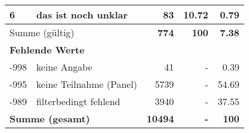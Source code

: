 \begin{longtable}{lXrrr}
     6 &
     \multicolumn{1}{X}{ das ist noch unklar   } &


       \num{83} &
       \num[round-mode=places,round-precision=2]{10,72} &
         \num[round-mode=places,round-precision=2]{0,79} \\
     \midrule
     \multicolumn{2}{l}{Summe (gültig)} &
       \textbf{\num{774}} &
     \textbf{100} &
       \textbf{\num[round-mode=places,round-precision=2]{7,38}} \\
     \multicolumn{5}{l}{\textbf{Fehlende Werte}}\\
       -998 &
       keine Angabe &
         \num{41} &
        - &
         \num[round-mode=places,round-precision=2]{0,39} \\
       -995 &
       keine Teilnahme (Panel) &
         \num{5739} &
        - &
         \num[round-mode=places,round-precision=2]{54,69} \\
       -989 &
       filterbedingt fehlend &
         \num{3940} &
        - &
         \num[round-mode=places,round-precision=2]{37,55} \\
     \midrule
     \multicolumn{2}{l}{\textbf{Summe (gesamt)}} &
          \textbf{\num{10494}} &
        \textbf{-} &
        \textbf{100} \\
     \bottomrule
     \end{longtable}
     
